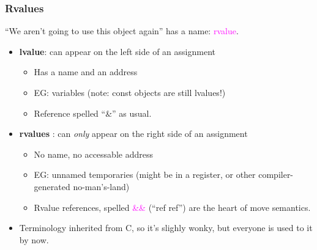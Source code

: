 \begin{frame}[fragile]
\frametitle{Rvalues}

``We aren't going to use this object again'' has a
name: \textcolor{magenta} {rvalue}.


\pause
{
\vskip 6pt

\begin{itemize}[<+->]

\item {\bf lvalue}: can appear on the left side of an assignment
\begin{itemize}     
  \item Has a name and an address
  \item EG: variables (note: const objects are still lvalues!)
  \item Reference spelled ``\&'' as usual.
\end{itemize}

\vskip 6pt

\item {\bf rvalues} : can \emph{only} appear on the right side of an assignment
  \begin{itemize}
  \item No name, no accessable address
  \item EG: unnamed temporaries (might be in a register, or other
  compiler-generated no-man's-land)
  \item Rvalue references, spelled \textcolor{magenta}{\&\&} (``ref ref'') are the heart of move semantics.
  \end{itemize}

\vskip 6pt

\item Terminology inherited from C, so it's slighly wonky, but
  everyone is used to it by now.

\end{itemize}
}

\end{frame}


